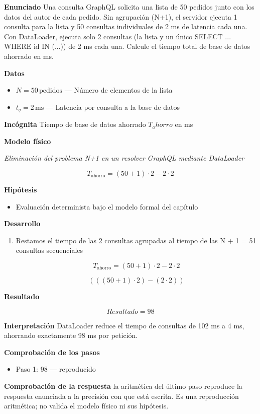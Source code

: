 \documentclass{book}
\begin{document}
\begin{tcolorbox}[title={Problema resuelto}, studiumworked, breakable]

\noindent\textbf{Enunciado}
Una consulta GraphQL solicita una lista de 50 pedidos junto con los datos del autor de cada pedido. Sin agrupación (N+1), el servidor ejecuta 1 consulta para la lista y 50 consultas individuales de 2 ms de latencia cada una. Con DataLoader, ejecuta solo 2 consultas (la lista y un único SELECT ... WHERE id IN (...)) de 2 ms cada una. Calcule el tiempo total de base de datos ahorrado en ms.

\noindent\textbf{Datos}
\begin{itemize}
\item $N = 50\,\mathrm{pedidos}$ — Número de elementos de la lista
\item $t_{q} = 2\,\mathrm{ms}$ — Latencia por consulta a la base de datos
\end{itemize}

\noindent\textbf{Incógnita}
Tiempo de base de datos ahorrado \(T_ahorro\) en ms

\noindent\textbf{Modelo físico}

\noindent\textit{Eliminación del problema N+1 en un resolver GraphQL mediante DataLoader}

\[
T_{\text{ahorro}} = (50 + 1) \cdot 2 - 2 \cdot 2
\]

\noindent\textbf{Hipótesis}
\begin{itemize}
\item Evaluación determinista bajo el modelo formal del capítulo
\end{itemize}

\noindent\textbf{Desarrollo}
\begin{enumerate}
\item
Restamos el tiempo de las 2 consultas agrupadas al tiempo de las N + 1 = 51 consultas secuenciales

\[
T_{\text{ahorro}} = (50 + 1) \cdot 2 - 2 \cdot 2
\]

\[
\left(\left(\left(50+1\right)\cdot 2\right)-\left(2\cdot 2\right)\right)
\]
\end{enumerate}

\noindent\textbf{Resultado}

\[
Resultado = 98
\]

\noindent\textbf{Interpretación}
DataLoader reduce el tiempo de consultas de 102 ms a 4 ms, ahorrando exactamente 98 ms por petición.

\noindent\textbf{Comprobación de los pasos}
\begin{itemize}
\item Paso 1: $98$ — reproducido
\end{itemize}

\noindent\textbf{Comprobación de la respuesta} la aritmética del último paso reproduce la respuesta enunciada a la precisión con que está escrita. Es una reproducción aritmética; no valida el modelo físico ni sus hipótesis.
\end{tcolorbox}
\end{document}
